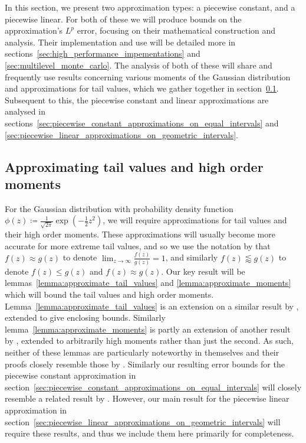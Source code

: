 \documentclass[manuscript,review]{acmart}
\begin{document}
In this section, we present two approximation types: a piecewise constant, and a piecewise linear. For both of these we will produce bounds on the approximation's $ L^p $ error, focusing on their mathematical construction and analysis. Their implementation and use will be detailed more in sections~\ref{sec:high_performance_impementations} and \ref{sec:multilevel_monte_carlo}. The analysis of both of these will share and frequently use results concerning various moments of the Gaussian distribution and approximations for tail values, which we gather together in section~\ref{sec:approximating_tail_values_and_high_order_moments}. Subsequent to this, the piecewise constant and linear approximations are analysed in sections~\ref{sec:piecewise_constant_approximations_on_equal_intervals} and \ref{sec:piecewise_linear_approximations_on_geometric_intervals}.

\subsection{Approximating tail values and high order moments}
\label{sec:approximating_tail_values_and_high_order_moments}

For the Gaussian distribution with probability density function $ \phi(z) \coloneqq \tfrac{1}{\sqrt{2\pi}} {\exp}(-\tfrac{1}{2}z^2) $, we will require approximations for tail values and their high order moments. These approximations will usually become more accurate for more extreme tail values, and so we use the notation by \citet{giles2019random_quadrature} that $ f(z) \approx g(z) $ to denote $ \lim_{z\to\infty} \tfrac{f(z)}{g(z)} = 1 $, and similarly $ f(z) \lessapprox g(z) $ to denote $ f(z) \leq g(z) $ and $ f(z) \approx g(z) $. Our key result will be lemmas~\ref{lemma:approximate_tail_values} and \ref{lemma:approximate_moments} which will bound the tail values and high order moments. Lemma~\ref{lemma:approximate_tail_values} is an extension on a similar result by \citet[lemma~7]{giles2019random_quadrature}, extended to give enclosing bounds. Similarly lemma~\ref{lemma:approximate_moments} is partly an extension of another result by \citet[lemma~9]{giles2019random_quadrature}, extended to arbitrarily high moments rather than just the second. As such, neither of these lemmas are particularly noteworthy in themselves and their proofs closely resemble those by \citet[appendix~A]{giles2019random_quadrature}. Similarly our resulting error bounds for the piecewise constant approximation in section~\ref{sec:piecewise_constant_approximations_on_equal_intervals} will closely resemble a related result by \citet[theorem~1]{giles2019random_quadrature}. However, our main result for the piecewise linear approximation in section~\ref{sec:piecewise_linear_approximations_on_geometric_intervals} will require these results, and thus we include them here primarily for completeness. 
\end{document}
